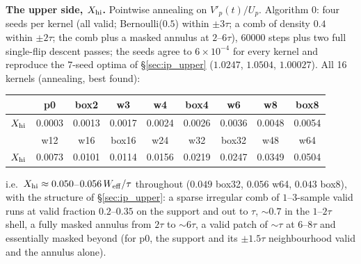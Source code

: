 \documentclass{article}
\numberwithin{equation}{section}   %
\begin{document}
{\bf The upper side, $X_{\rm hi}$.}  Pointwise annealing on $V'_p(t)/U_p$.  Algorithm 0: four seeds per
kernel (all valid; Bernoulli($0.5$) within $\pm 3\tau$; a comb of density $0.4$ within $\pm 2\tau$; the comb
plus a masked annulus at $2$--$6\tau$), $60000$ steps plus two full single-flip descent passes; the seeds
agree to $6 \times 10^{-4}$ for every kernel and reproduce the $7$-seed optima of \S\ref{sec:ip_upper}
($1.0247$, $1.0504$, $1.00027$).  All 16 kernels (annealing, best found):
\begin{center}\small
\begin{tabular}{lcccccccc}
\toprule
& p0 & box2 & w3 & w4 & box4 & w6 & w8 & box8 \\
\midrule
$X_{\rm hi}$ & 0.0003 & 0.0013 & 0.0017 & 0.0024 & 0.0026 & 0.0036 & 0.0048 & 0.0054 \\
\midrule
& w12 & w16 & box16 & w24 & w32 & box32 & w48 & w64 \\
\midrule
$X_{\rm hi}$ & 0.0073 & 0.0101 & 0.0114 & 0.0156 & 0.0219 & 0.0247 & 0.0349 & 0.0504 \\
\bottomrule
\end{tabular}
\end{center}
i.e.\ $X_{\rm hi} \approx 0.050$--$0.056\,W_{\rm eff}/\tau$ throughout ($0.049$ box32, $0.056$ w64, $0.043$
box8), with the structure of \S\ref{sec:ip_upper}: a sparse irregular comb of $1$--$3$-sample valid runs
at valid fraction $0.2$--$0.35$ on the support and out to $\tau$, $\sim 0.7$ in the $1$--$2\tau$ shell, a
fully masked annulus from $2\tau$ to $\sim 6\tau$, a valid patch of $\sim\tau$ at $6$--$8\tau$ and
essentially masked beyond (for p0, the support and its $\pm 1.5\tau$ neighbourhood valid and the annulus
alone).
\end{document}
